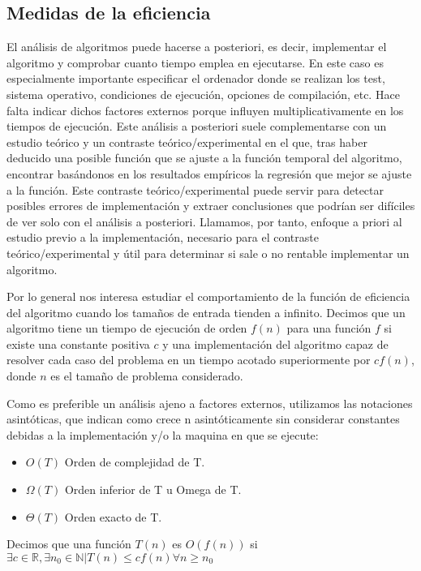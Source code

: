 \documentclass[a4paper, 11pt]{article}
\begin{document}
\subsection{Medidas de la eficiencia}
El análisis de algoritmos puede hacerse a posteriori, es decir, implementar el algoritmo y comprobar cuanto tiempo emplea en ejecutarse. En este caso es especialmente importante especificar el ordenador donde se realizan los test, sistema operativo, condiciones de ejecución, opciones de compilación, etc. Hace falta indicar dichos factores externos porque influyen multiplicativamente en los tiempos de ejecución. Este análisis a posteriori suele complementarse con un estudio teórico y un contraste teórico/experimental en el que, tras haber deducido una posible función que se ajuste a la función temporal del algoritmo, encontrar basándonos en los resultados empíricos la regresión que mejor se ajuste a la función. Este contraste teórico/experimental puede servir para detectar posibles errores de implementación y extraer conclusiones que podrían ser difíciles de ver solo con el análisis a posteriori. Llamamos, por tanto, enfoque a priori al estudio previo a la implementación, necesario para el contraste teórico/experimental y útil para determinar si sale o no rentable implementar un algoritmo.

Por lo general nos interesa estudiar el comportamiento de la función de eficiencia del algoritmo cuando los tamaños de entrada tienden a infinito. Decimos que un algoritmo tiene un tiempo de ejecución de orden $f(n)$ para una función $f$ si existe una constante positiva $c$ y una implementación del algoritmo capaz de resolver cada caso del problema en un tiempo acotado superiormente por $cf(n)$, donde $n$ es el tamaño de problema considerado.  

Como es preferible un análisis ajeno a factores externos, utilizamos las notaciones asintóticas, que indican como crece n asintóticamente sin considerar constantes debidas a la implementación y/o la maquina en que se ejecute:

\begin{itemize}
	\item $O(T)$ Orden de complejidad de T. 
	\item $\Omega(T)$ Orden inferior de T u Omega de T.
	\item $\Theta(T)$ Orden exacto de T.
\end{itemize}

Decimos que una función $T(n)$ es $O(f(n))$ si $\exists c \in \mathbb{R}, \exists n_{0} \in \mathbb{N} | T(n) \leq cf(n) \forall n \geq n_{0}$
\end{document}
